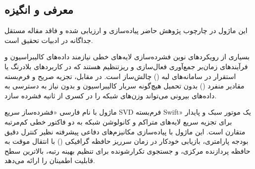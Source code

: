 \subsection{معرفی و انگیزه}
این ماژول در چارچوب پژوهش حاضر پیاده‌سازی و ارزیابی شده و فاقد مقاله مستقل جداگانه در ادبیات تحقیق است.

بسیاری از رویکردهای نوین فشرده‌سازی لایه‌های خطی نیازمند داده‌های کالیبراسیون و فرآیندهای زمان‌بر جمع‌آوری فعال‌سازی و ریزتنظیم هستند که در کاربردهای بلادرنگ یا استقرار در سامانه‌های لبه () چالش‌ساز است. در مقابل، تجزیه صریح و فرم‌بسته مقادیر منفرد () بدون تحمیل هیچ‌گونه سربار کالیبراسیون و بدون نیاز به دسترسی به داده‌های بیرونی می‌تواند وزن‌های شبکه را در کسری از ثانیه فشرده سازد.

ماژول  با نام فارسی «فشرده‌ساز سریع SVD فرم‌بسته Swift» یک موتور سبک و پایدار برای تجزیه سریع لایه‌های متراکم و کانولوشن شبکه به دو فاکتور خطی کم‌مرتبه متقارن است. این ماژول با پیاده‌سازی مکانیزم‌های دفاعی پیشرفته نظیر کنترل دقیق بودجه پارامتری، بازیابی خودکار در زمان سرریز حافظه گرافیکی () با انتقال موقت به حافظه پردازنده مرکزی، و جستجوی تکرارشونده برای تنظیم بهینه رتبه، بالاترین سطح قابلیت اطمینان را ارائه می‌دهد.
